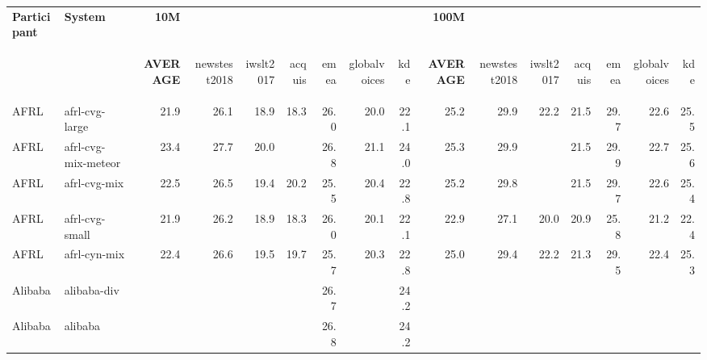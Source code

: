 \begin{table*}\small
\begin{center}
\setlength{\tabcolsep}{2pt}
\newcommand{\testSetTop}[1]{\begin{sideways}{\sc #1}\end{sideways} }
\begin{tabular}{|l|l|rrrrrrr|rrrrrrr|} \hline
\bf Participant & \bf System & \bf 10M &&&&&&& \bf 100M &&&&&&\\
&& \testSetTop{\bf AVERAGE} & \testSetTop{newstest2018} & \testSetTop{iwslt2017} & \testSetTop{acquis} & \testSetTop{emea} & \testSetTop{globalvoices} & \testSetTop{kde}& \testSetTop{\bf AVERAGE} & \testSetTop{newstest2018} & \testSetTop{iwslt2017} & \testSetTop{acquis} & \testSetTop{emea} & \testSetTop{globalvoices} & \testSetTop{kde}\\ \hline
AFRL & afrl-cvg-large & 21.9 & 26.1 & 18.9 & 18.3 & 26.0 & 20.0 & 22.1 & 25.2 & 29.9 & 22.2 & 21.5 & 29.7 & 22.6 & 25.5 \\ \hline
AFRL & afrl-cvg-mix-meteor & 23.4 & 27.7 & 20.0 & \cellcolor{lightyellow}{20.6} & 26.8 & 21.1 & 24.0 & 25.3 & 29.9 & \cellcolor{lightyellow}{22.3} & 21.5 & 29.9 & 22.7 & 25.6 \\ \hline
AFRL & afrl-cvg-mix & 22.5 & 26.5 & 19.4 & 20.2 & 25.5 & 20.4 & 22.8 & 25.2 & 29.8 & \cellcolor{lightyellow}{22.3} & 21.5 & 29.7 & 22.6 & 25.4 \\ \hline
AFRL & afrl-cvg-small & 21.9 & 26.2 & 18.9 & 18.3 & 26.0 & 20.1 & 22.1 & 22.9 & 27.1 & 20.0 & 20.9 & 25.8 & 21.2 & 22.4 \\ \hline
AFRL & afrl-cyn-mix & 22.4 & 26.6 & 19.5 & 19.7 & 25.7 & 20.3 & 22.8 & 25.0 & 29.4 & 22.2 & 21.3 & 29.5 & 22.4 & 25.3 \\ \hline
Alibaba & alibaba-div & \cellcolor{lightyellow}{24.1} & \cellcolor{lightyellow}{29.1} & \cellcolor{green}{22.2} & \cellcolor{lightyellow}{20.6} & 26.7 & \cellcolor{lightyellow}{22.0} & 24.2 & \cellcolor{lightgreen}{26.4} & \cellcolor{lightgreen}{31.2} & \cellcolor{lightgreen}{22.9} & \cellcolor{lightgreen}{22.4} & \cellcolor{lightgreen}{31.2} & \cellcolor{green}{24.0} & \cellcolor{lightgreen}{26.8} \\ \hline
Alibaba & alibaba & \cellcolor{lightyellow}{24.1} & \cellcolor{lightyellow}{28.9} & \cellcolor{lightgreen}{22.1} & \cellcolor{lightyellow}{20.5} & 26.8 & \cellcolor{lightyellow}{22.0} & 24.2 & \cellcolor{lightgreen}{26.4} & \cellcolor{lightgreen}{31.1} & \cellcolor{lightgreen}{23.0} & \cellcolor{green}{22.5} & \cellcolor{lightgreen}{31.2} & \cellcolor{green}{24.0} & \cellcolor{lightgreen}{26.8} \\ \hline

\end{tabular}
\end{center}
\end{table*}
